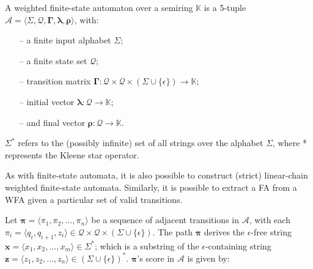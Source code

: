 \begin{definition}
  \label{def:wfa}
  A weighted finite-state automaton over a semiring $\mathbb{K}$ is a 5-tuple
  $\mathcal{A} = \langle \Sigma, \mathcal{Q}, \bm{\Gamma}, \bm{\lambda}, \bm{\rho} \rangle$,
  with:

  \begin{itemize}
    \itemsep0em
    \item[--] a finite input alphabet $\Sigma$;
    \item[--] a finite state set $\mathcal{Q}$;
    \item[--] transition matrix $\bm{\Gamma}: \mathcal{Q} \times \mathcal{Q} \times
    (\Sigma \cup \{\epsilon\}) \rightarrow \mathbb{K}$;
    \item[--] initial vector $\bm{\lambda}: \mathcal{Q} \rightarrow \mathbb{K}$;
    \item[--] and final vector $\bm{\rho}: \mathcal{Q} \rightarrow \mathbb{K}$.
  \end{itemize}

  \begin{remark}
    $\Sigma^{*}$ refers to the (possibly infinite) set of all strings over the
    alphabet $\Sigma$, where * represents the Kleene star operator.
  \end{remark}

  \begin{remark}
    As with finite-state automata, it is also possible to construct (strict)
    linear-chain weighted finite-state automata. Similarly, it is possible to
    extract a FA from a WFA given a particular set of valid transitions.
  \end{remark}
 
\end{definition}

\begin{definition}

  Let $\bm{\pi} = \langle \pi_1, \pi_2, \dots, \pi_n \rangle$ be a sequence of
  adjacent transitions in $\mathcal{A}$, with each $\pi_i = \langle q_i,
  q_{i+1}, z_i \rangle \in \mathcal{Q} \times \mathcal{Q} \times (\Sigma \cup
  \{\epsilon\})$. The path $\bm{\pi}$ derives the $\epsilon$-free string
  $\bm{x} = \langle x_1, x_2, \dots, x_m \rangle \in \Sigma^{*}$; which is a
  substring of the $\epsilon$-containing string $\bm{z} = \langle z_1, z_2,
  \dots, z_n \rangle \in (\Sigma \cup \{\epsilon\})^{*}$. $\bm{\pi}$'s score in
  $\mathcal{A}$ is given by:
  
\end{definition}

